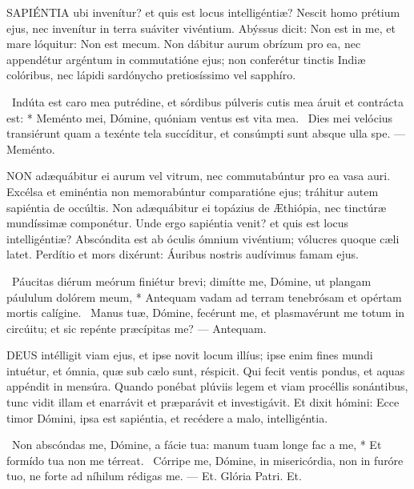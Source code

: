 


\lettrine[lines=2]{S}{APIÉNTIA} ubi invenítur? et quis est locus intelligéntiæ? Nescit homo prétium ejus, nec invenítur in terra suáviter vivéntium. Abýssus dicit: Non est in me, et mare lóquitur: Non est mecum. Non dábitur aurum obrízum pro ea, nec appendétur argéntum in commutatióne ejus; non conferétur tinctis Indiæ colóribus, nec lápidi sardónycho pretiosíssimo vel sapphíro.

\R\ Indúta est caro mea putrédine, et sórdibus púlveris cutis mea áruit et contrácta est: * Meménto mei, Dómine, quóniam ventus est vita mea. \V\ Dies mei velócius transiérunt quam a texénte tela succíditur, et consúmpti sunt absque ulla spe. — Meménto.


\lettrine[lines=2]{N}{ON} adæquábitur ei aurum vel vitrum, nec commutabúntur pro ea vasa auri. Excélsa et eminéntia non memorabúntur comparatióne ejus; tráhitur autem sapiéntia de occúltis. Non adæquábitur ei topázius de Æthiópia, nec tinctúræ mundíssimæ componétur. Unde ergo sapiéntia venit? et quis est locus intelligéntiæ? Abscóndita est ab óculis ómnium vivéntium; vólucres quoque cæli latet. Perdítio et mors dixérunt: Áuribus nostris audívimus famam ejus.

\R\ Páucitas diérum meórum finiétur brevi; dimítte me, Dómine, ut plangam páululum dolórem meum, * Antequam vadam ad terram tenebrósam et opértam mortis calígine. \V\ Manus tuæ, Dómine, fecérunt me, et plasmavérunt me totum in circúitu; et sic repénte præcípitas me? — Antequam.



\lettrine[lines=2]{D}{EUS} intélligit viam ejus, et ipse novit locum illíus; ipse enim fines mundi intuétur, et ómnia, quæ sub cælo sunt, réspicit. Qui fecit ventis pondus, et aquas appéndit in mensúra. Quando ponébat plúviis legem et viam procéllis sonántibus, tunc vidit illam et enarrávit et præparávit et investigávit. Et dixit hómini: Ecce timor Dómini, ipsa est sapiéntia, et recédere a malo, intelligéntia.

\R\ Non abscóndas me, Dómine, a fácie tua: manum tuam longe fac a me, * Et formído tua non me térreat. \V\ Córripe me, Dómine, in misericórdia, non in furóre tuo, ne forte ad níhilum rédigas me. — Et. Glória Patri. Et.

